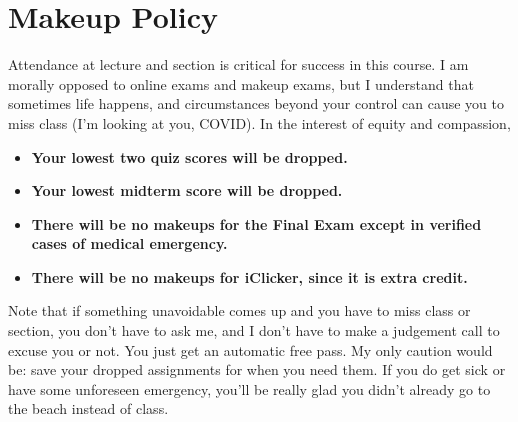 \documentclass[11pt,letterpaper]{article}
\begin{document}
\section*{Makeup Policy}
Attendance at lecture and section is critical for success in this course. I am morally opposed to online exams and makeup exams, but I understand that sometimes life happens, and circumstances beyond your control can cause you to miss class (I’m looking at you, COVID). In the interest of equity and compassion,
\begin{itemize}[nosep]
\item \textbf{Your lowest two quiz scores will be dropped.}
\item \textbf{Your lowest midterm score will be dropped.}
\item \textbf{There will be no makeups for the Final Exam except in verified cases of medical emergency.}
\item \textbf{There will be no makeups for iClicker, since it is extra credit.}
\end{itemize}
Note that if something unavoidable comes up and you have to miss class or section, you don’t have to ask me, and I don’t have to make a judgement call to excuse you or not. You just get an automatic free pass. My only caution would be: save your dropped assignments for when you need them. If you do get sick or have some unforeseen emergency, you’ll be really glad you didn’t already go to the beach instead of class.

\end{document}

